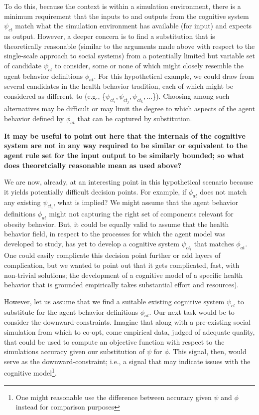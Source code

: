 \documentclass{article}
\begin{document}
To do this, because the context is within a simulation environment, there is a minimum requirement that the inputs to and outputs from the cognitive system $\psi_{ct}$ match what the simulation environment has available (for input) and expects as output.  However, a deeper concern is to find a substitution that is theoretically reasonable (similar to the arguments made above with respect to the single-scale approach to social systems) from a potentially limited but variable set of candidate $\psi_{ct}$ to consider, some or none of which might closely resemble the agent behavior definitions $\phi_{at}$. For this hypothetical example, we could draw from several candidates in the health behavior tradition, each of which might be considered as different, to  (e.g., \{$\psi_{ct_i}, \psi_{ct_j}, \psi_{ct_k},...$\}).  Choosing among such alternatives may be difficult or may limit the degree to which aspects of the agent behavior defined by $\phi_{at}$ that can be captured by substitution.

  
\textbf{It may be useful to point out here that the internals of the cognitive system are not in any way required to be similar or equivalent to the agent rule set for the input output to be similarly bounded; so what does theoretcially reasonable mean as used above?}


We are now, already, at an interesting point in this hypothetical scenario because it yields potentially difficult decision points.  For example,  if $\phi_{at}$ does not match any existing $\psi_{ct_i}$, what is implied?  We might assume that the agent behavior definitions $\phi_{at}$ might not capturing the right set of components relevant for obesity behavior.  But, it could be equally valid to assume that the health behavior field, in respect to the processes for which the agent model was developed to study, has yet to develop a cognitive system $\psi_{ct_i}$ that matches $\phi_{at}$.  One could easily complicate this decision point further or add layers of complication, but we wanted to point out that it gets complicated, fast, with non-trivial solutions; the development of a cognitive model of a specific health behavior that is grounded empirically takes substantial effort and resources).  

However, let us assume that we find a suitable existing cognitive system $\psi_{ct}$ to substitute for the agent behavior definitions $\phi_{at}$. Our next task would be to consider the downward-constraints.  Imagine that along with a pre-existing social simulation from which to co-opt, come empirical data, judged of adequate quality, that could be used to compute an objective function with respect to the simulations accuracy given our substitution of $\psi$ for $\phi$. This signal, then, would serve as the downward-constraint; i.e., a signal that may indicate issues with the cognitive model\footnote{One might reasonable use the difference between accuracy given $\psi$ and $\phi$ instead for comparison purposes}.  
\end{document}
